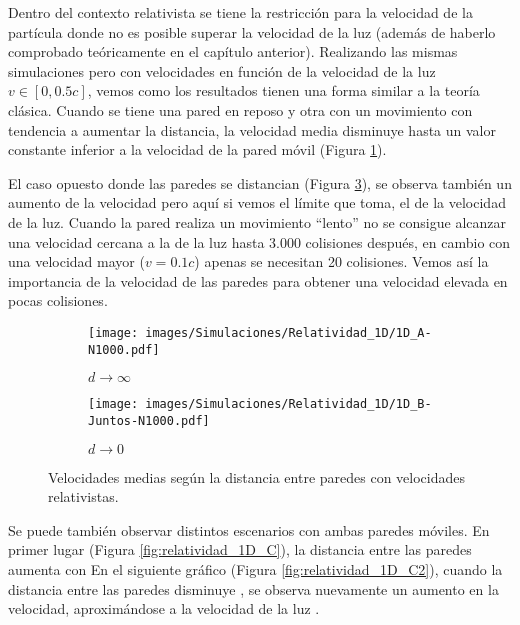 Dentro del contexto relativista se tiene la restricción para la velocidad de la partícula donde no es posible superar la velocidad de la luz (además de haberlo comprobado teóricamente en el capítulo anterior). Realizando las mismas simulaciones pero con velocidades en función de la velocidad de la luz \( v \in [0, 0.5c] \), vemos como los resultados tienen una forma similar a la teoría clásica. Cuando se tiene una pared en reposo y otra con un movimiento con tendencia a aumentar la distancia, la velocidad media disminuye hasta un valor constante inferior a la velocidad de la pared móvil (Figura \ref{fig:relatividad_1D_A}). 

\vspace{3mm}

El caso opuesto donde las paredes se distancian (Figura \ref{fig:relatividad_1D_B}), se observa también un aumento de la velocidad pero aquí si vemos el límite que toma, el de la velocidad de la luz. Cuando la pared realiza un movimiento ``lento'' no se consigue alcanzar una velocidad cercana a la de la luz hasta 3.000 colisiones después, en cambio con una velocidad mayor (\(v = 0.1c\)) apenas se necesitan 20 colisiones. Vemos así la importancia de la velocidad de las paredes para obtener una velocidad elevada en pocas colisiones.

\vspace{3mm}

\begin{figure}[H]
    \begin{subfigure}[b]{0.5\textwidth}
        \centering
        \texttt{[image: images/Simulaciones/Relatividad\_1D/1D\_A-N1000.pdf]}
        \caption{$d \rightarrow \infty$}
        \label{fig:relatividad_1D_A}
    \end{subfigure}
    \hfill
    \begin{subfigure}[b]{0.5\textwidth}
        \centering
        \texttt{[image: images/Simulaciones/Relatividad\_1D/1D\_B-Juntos-N1000.pdf]}
        \caption{$d \rightarrow 0$}
        \label{fig:relatividad_1D_B}
    \end{subfigure}
    \caption{Velocidades medias según la distancia entre paredes con velocidades relativistas.}
\end{figure}

Se puede también observar distintos escenarios con ambas paredes móviles. En primer lugar (Figura \ref{fig:relatividad_1D_C}), la distancia entre las paredes aumenta con  En el siguiente gráfico (Figura \ref{fig:relatividad_1D_C2}), cuando la distancia entre las paredes disminuye , se observa nuevamente un aumento en la velocidad, aproximándose a la velocidad de la luz . 

